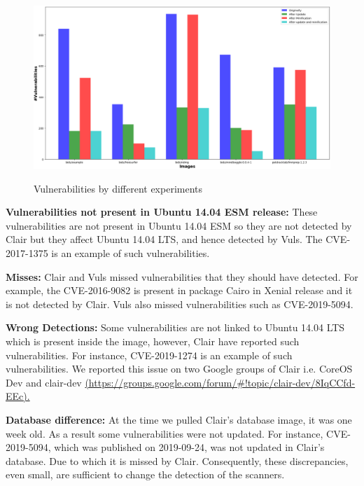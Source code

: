\documentclass[a4paper,num-refs]{oup-contemporary}
\begin{document}
\begin{figure}[!ht]
        {\includegraphics[scale=1.5,width=\textwidth]
        {Figures/bargraph.png}}
	\vspace*{-5mm}
        \caption{\label{fig:bargraph} Vulnerabilities by different experiments}
      \end{figure}
\textbf{Vulnerabilities not present in Ubuntu 14.04 ESM release:} These vulnerabilities are not present in Ubuntu 14.04 ESM so they 
are not detected by Clair but they affect Ubuntu 14.04 LTS, and hence detected by Vuls. The CVE-2017-1375 is an example
of such vulnerabilities.

\textbf{Misses:} Clair and Vuls
missed vulnerabilities that they should have detected. For example, the CVE-2016-9082 
is present in package Cairo in Xenial release and it is not detected by Clair.
Vuls also missed vulnerabilities such as CVE-2019-5094.

\textbf{Wrong Detections:} 
Some vulnerabilities are not linked to Ubuntu 14.04 LTS which is 
present inside the image, however, Clair have reported such vulnerabilities.
For instance, CVE-2019-1274 is an example of such vulnerabilities. 
We reported this issue on two Google groups of Clair i.e. CoreOS Dev and
clair-dev \url{(https://groups.google.com/forum/\#!topic/clair-dev/8IqCCfd-EEc).}

\textbf{Database difference:} At the time we pulled Clair's database image, it was one week old.
                              As a result some vulnerabilities were not updated. For instance, CVE-2019-5094, which
		              was published on 2019-09-24, was not 
		              updated in Clair's database. Due to which it is missed by Clair.
			      Consequently, these discrepancies, even small, are sufficient to change the detection of
			      the scanners.
\end{document}
